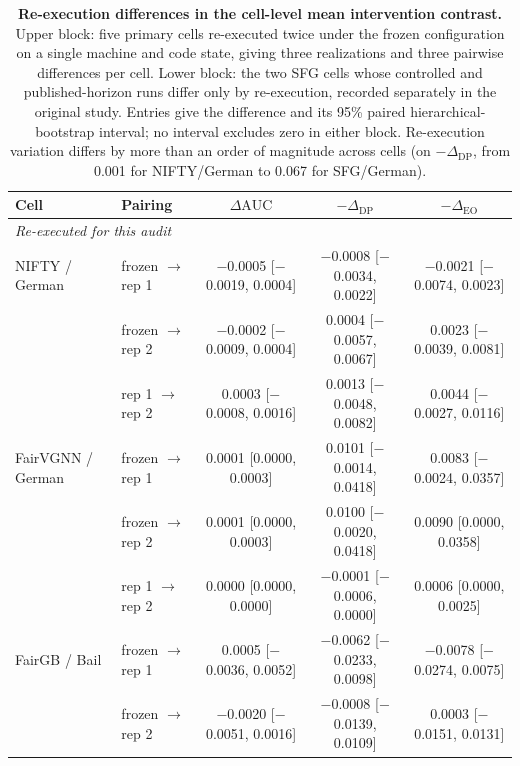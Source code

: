 \begin{table}[t]
\centering
\caption{\textbf{Re-execution differences in the cell-level mean intervention contrast.}
Upper block: five primary cells re-executed twice under the frozen configuration on a single machine and code state, giving three realizations and three pairwise differences per cell.
Lower block: the two SFG cells whose controlled and published-horizon runs differ only by re-execution, recorded separately in the original study.
Entries give the difference and its 95\% paired hierarchical-bootstrap interval; no interval excludes zero in either block.
Re-execution variation differs by more than an order of magnitude across cells (on \(-\Delta_{\mathrm{DP}}\), from 0.001 for NIFTY/German to 0.067 for SFG/German).}
\label{tab:noise_floor}
\vspace{-0.2cm}
\scriptsize
\setlength{\tabcolsep}{4pt}
\renewcommand{\arraystretch}{1.05}
\begin{tabular}{llccc}
\toprule
Cell & Pairing & \(\Delta\mathrm{AUC}\) & \(-\Delta_{\mathrm{DP}}\) & \(-\Delta_{\mathrm{EO}}\) \\
\midrule
\multicolumn{5}{l}{\textit{Re-executed for this audit}} \\
\addlinespace[1pt]
NIFTY / German & frozen \(\rightarrow\) rep 1 & $-$0.0005 [$-$0.0019, 0.0004] & $-$0.0008 [$-$0.0034, 0.0022] & $-$0.0021 [$-$0.0074, 0.0023] \\
 & frozen \(\rightarrow\) rep 2 & $-$0.0002 [$-$0.0009, 0.0004] & 0.0004 [$-$0.0057, 0.0067] & 0.0023 [$-$0.0039, 0.0081] \\
 & rep 1 \(\rightarrow\) rep 2 & 0.0003 [$-$0.0008, 0.0016] & 0.0013 [$-$0.0048, 0.0082] & 0.0044 [$-$0.0027, 0.0116] \\
\addlinespace[2pt]
FairVGNN / German & frozen \(\rightarrow\) rep 1 & 0.0001 [0.0000, 0.0003] & 0.0101 [$-$0.0014, 0.0418] & 0.0083 [$-$0.0024, 0.0357] \\
 & frozen \(\rightarrow\) rep 2 & 0.0001 [0.0000, 0.0003] & 0.0100 [$-$0.0020, 0.0418] & 0.0090 [0.0000, 0.0358] \\
 & rep 1 \(\rightarrow\) rep 2 & 0.0000 [0.0000, 0.0000] & $-$0.0001 [$-$0.0006, 0.0000] & 0.0006 [0.0000, 0.0025] \\
\addlinespace[2pt]
FairGB / Bail & frozen \(\rightarrow\) rep 1 & 0.0005 [$-$0.0036, 0.0052] & $-$0.0062 [$-$0.0233, 0.0098] & $-$0.0078 [$-$0.0274, 0.0075] \\
 & frozen \(\rightarrow\) rep 2 & $-$0.0020 [$-$0.0051, 0.0016] & $-$0.0008 [$-$0.0139, 0.0109] & 0.0003 [$-$0.0151, 0.0131] \\

\end{tabular}
\end{table}
